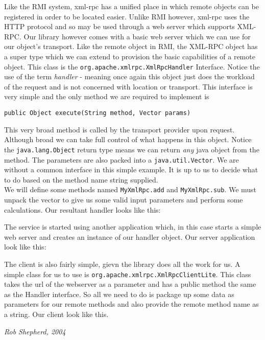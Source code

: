 \documentclass[12pt,a4paper]{article}
\begin{document}
Like the RMI system, xml-rpc has a unified place in which remote objects can be registered in order to be located easier. Unlike RMI however, xml-rpc uses the HTTP protocol and so may be used through a web server which supports XML-RPC. Our library however comes with a basic web server which we can use for our object's transport. Like the remote object in RMI, the XML-RPC object has a super type which we can extend to provision the basic capabilities of a remote object. This class is the {\tt org.apache.xmlrpc.XmlRpcHandler} Interface. Notice the use of the term {\em handler} - meaning once again this object just does the workload of the request and is not concerned with location or transport.
This interface is very simple and the only method we are required to implement is
\begin{verbatim}
public Object execute(String method, Vector params)
\end{verbatim}
This very broad method is called by the transport provider upon request. Although broad we can take full control of what happens in this object. Notice the {\tt java.lang.Object} return type means we can return {\em any} java object from the method. 
The parameters are also packed into a {\tt java.util.Vector}. We are without a common interface in this simple example. It is up to us to
decide what to do based on the method name string supplied. \\
We will define some methods named {\tt MyXmlRpc.add} and {\tt MyXmlRpc.sub}. We must unpack the vector to give us some valid input parameters and perform some calculations. Our resultant handler looks like this:
\pagebreak

\pagebreak
The service is started using another application which, in this case starts a simple web server and creates an instance of our handler object. Our server application look like this:



The client is also fairly simple, gievn the library does all the work for us. A simple class for us to use is {\tt org.apache.xmlrpc.XmlRpcClientLite}. This class takes the url of the webserver as a parameter and has a public method the same as the Handler interface. So all we need to do is package up some data as parameters for our remote methods and also provide the remote method name as a string. Our client look like this.
\pagebreak

\vfill
\textit{Rob Shepherd, 2004}
\end{document}
